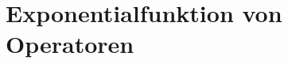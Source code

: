 \documentclass[a4paper,11pt]{article}
\begin{document}
\subsection{}

\section{Exponentialfunktion von Operatoren}

\subsection{}

\subsection{}

\subsection{}
\end{document}
